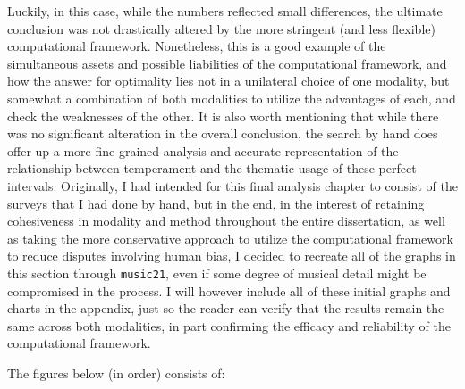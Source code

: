 Luckily, in this case, while the numbers reflected small differences,
the ultimate conclusion was not drastically altered by the more
stringent (and less flexible) computational framework. Nonetheless, this
is a good example of the simultaneous assets and possible liabilities of
the computational framework, and how the answer for optimality lies not
in a unilateral choice of one modality, but somewhat a combination of
both modalities to utilize the advantages of each, and check the
weaknesses of the other. It is also worth mentioning that while there
was no significant alteration in the overall conclusion, the search by
hand does offer up a more fine-grained analysis and accurate
representation of the relationship between temperament and the thematic
usage of these perfect intervals. Originally, I had intended for this
final analysis chapter to consist of the surveys that I had done by
hand, but in the end, in the interest of retaining cohesiveness in
modality and method throughout the entire dissertation, as well as
taking the more conservative approach to utilize the computational
framework to reduce disputes involving human bias, I decided to recreate
all of the graphs in this section through \texttt{music21}, even if some
degree of musical detail might be compromised in the process. I will
however include all of these initial graphs and charts in the appendix,
just so the reader can verify that the results remain the same across
both modalities, in part confirming the efficacy and reliability of the
computational framework.

The figures below (in order) consists of:

